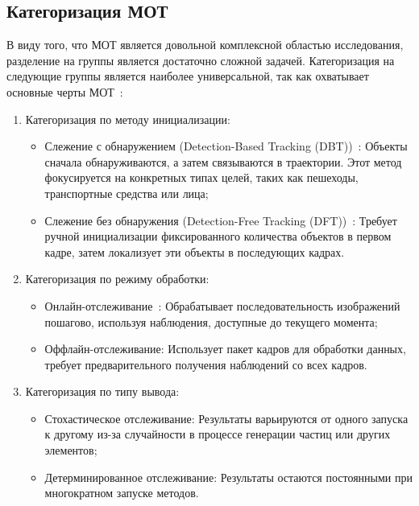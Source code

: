 \subsection{Категоризация МОТ}\label{subsec:MOT_category}


В виду того, что МОТ является довольной комплексной областью исследования, разделение на группы является достаточно сложной задачей. Категоризация на следующие группы является наиболее универсальной, так как охватывает основные черты МОТ~\cite{Article::Luo2021}: 

\begin{enumerate}

	\item Категоризация по методу инициализации: 
		
	\begin{itemize}
		
		\item Слежение с обнаружением (Detection-Based Tracking (DBT))~\cite{Bose2007, Song2010}: Объекты сначала обнаруживаются, а затем связываются в траектории. Этот метод фокусируется на конкретных типах целей, таких как пешеходы, транспортные средства или лица;
		
		\item Слежение без обнаружения (Detection-Free Tracking (DFT))~\cite{Zhang2013}: Требует ручной инициализации фиксированного количества объектов в первом кадре, затем локализует эти объекты в последующих кадрах.
	
	\end{itemize}
	
	\item Категоризация по режиму обработки:
	
	\begin{itemize}
		
		\item Онлайн-отслеживание~\cite{Xiang2015}: Обрабатывает последовательность изображений пошагово, используя наблюдения, доступные до текущего момента;
		
		\item Оффлайн-отслеживание: Использует пакет кадров для обработки данных, требует предварительного получения наблюдений со всех кадров.
		
	\end{itemize}
	
	\item Категоризация по типу вывода:
	
	\begin{itemize}
		
		\item Стохастическое отслеживание: Результаты варьируются от одного запуска к другому из-за случайности в процессе генерации частиц или других элементов;
		
		\item Детерминированное отслеживание: Результаты остаются постоянными при многократном запуске методов.
		
	\end{itemize}
	
\end{enumerate}


